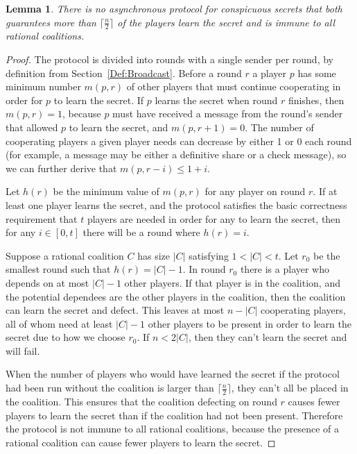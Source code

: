\documentclass[12pt]{dalcsthesis}
\newtheorem{lemma}{Lemma}
\begin{document}
\begin{lemma}\label{Lem:Async:NoConspGoodRatImmune}There is no asynchronous protocol for conspicuous secrets that both guarantees more than $\lceil \frac{n}{2} \rceil$ of the players learn the secret and is immune to all rational coalitions.\end{lemma}
\begin{proof}
The protocol is divided into rounds with a single sender per round, by definition from Section~\ref{Def:Broadcast}. Before a round $r$ a player $p$ has some minimum number $m(p, r)$ of other players that must continue cooperating in order for $p$ to learn the secret. If $p$ learns the secret when round $r$ finishes, then $m(p, r) = 1$, because $p$ must have received a message from the round's sender that allowed $p$ to learn the secret, and $m(p, r+1) = 0$. The number of cooperating players a given player needs can decrease by either 1 or 0 each round (for example, a message may be either a definitive share or a check message), so we can further derive that $m(p, r-i) \leq 1+i$.

Let $h(r)$ be the minimum value of $m(p, r)$ for any player on round $r$. If at least one player learns the secret, and the protocol satisfies the basic correctness requirement that $t$ players are needed in order for any to learn the secret, then for any $i \in [0, t]$ there will be a round where $h(r) = i$.

Suppose a rational coalition $C$ has size $|C|$ satisfying $1 < |C| < t$. Let $r_0$ be the smallest round such that $h(r) = |C|-1$. In round $r_0$ there is a player who depends on at most $|C|-1$ other players. If that player is in the coalition, and the potential dependees are the other players in the coalition, then the coalition can learn the secret and defect. This leaves at most $n-|C|$ cooperating players, all of whom need at least $|C|-1$ other players to be present in order to learn the secret due to how we choose $r_0$. If $n < 2 |C|$, then they can't learn the secret and will fail.

When the number of players who would have learned the secret if the protocol had been run without the coalition is larger than $\lceil \frac{n}{2} \rceil$, they can't all be placed in the coalition. This ensures that the coalition defecting on round $r$ causes fewer players to learn the secret than if the coalition had not been present. Therefore the protocol is not immune to all rational coalitions, because the presence of a rational coalition can cause fewer players to learn the secret.
\end{proof}
\end{document}
